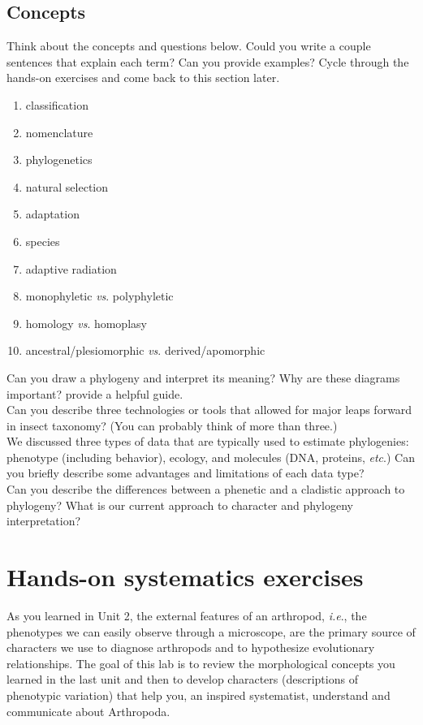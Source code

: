 \documentclass[letterpaper, 11pt]{article}
\begin{document}
\subsection{Concepts}
Think about the concepts and questions below. Could you write a couple sentences that explain each term? Can you provide examples? Cycle through the hands-on exercises and come back to this section later. 

\begin{enumerate} 
\item classification
\item nomenclature
\item phylogenetics 
\item{natural selection} 
\item{adaptation}  
\item{species}  
\item {adaptive radiation}
\item {monophyletic \textit{vs}. polyphyletic}  
\item {homology \textit{vs}. homoplasy}  
\item {ancestral/plesiomorphic \textit{vs}. derived/apomorphic}
\end{enumerate}

\noindent{}Can you draw a phylogeny and interpret its meaning? Why are these diagrams important? \cite{baum2008phylogenics} provide a helpful guide.\\

\noindent{}Can you describe three technologies or tools that allowed for major leaps forward in insect taxonomy? (You can probably think of more than three.)\\

\noindent{}We discussed three types of data that are typically used to estimate phylogenies: phenotype (including behavior), ecology, and molecules (DNA, proteins, \textit{etc}.) Can you briefly describe some advantages and limitations of each data type?\\

\noindent{}Can you describe the differences between a phenetic and a cladistic approach to phylogeny? What is our current approach to character and phylogeny interpretation? \\

\section{Hands-on systematics exercises}
As you learned in Unit 2, the external features of an arthropod, \textit{i.e}., the phenotypes we can easily observe through a microscope, are the primary source of characters we use to diagnose arthropods and to hypothesize evolutionary relationships. The goal of this lab is to review the morphological concepts you learned in the last unit and then to develop characters (descriptions of phenotypic variation) that help you, an inspired systematist, understand and communicate about Arthropoda.
\end{document}
